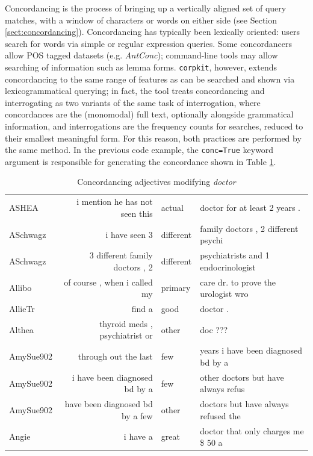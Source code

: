 Concordancing is the process of bringing up a vertically aligned set of query matches, with a window of characters or words on either side (see Section \ref{sect:concordancing}). Concordancing has typically been lexically oriented: users search for words via simple or regular expression queries. Some concordancers allow \gls{POS} tagged datasets (e.g. \emph{AntConc}); command\hyp{}line tools may allow searching of information such as lemma forms. \texttt{corpkit}, however, extends concordancing to the same range of features as can be searched and shown via lexicogrammatical querying; in fact, the tool treats concordancing and interrogating as two variants of the same task of interrogation, where concordances are the (monomodal) full text, optionally alongside grammatical information, and  interrogations are the frequency counts for searches, reduced to their smallest meaningful form. For this reason, both practices are performed by the same method. In the previous code example, the \texttt{conc=True} keyword argument is responsible for generating the concordance shown in Table \ref{conc:mod_doc_example}.

\FloatBarrier

\begin{table}[htb]
\footnotesize
\begin{tabular}{lrll}

\toprule
     ASHEA & i mention he has not seen this &  actual    &  doctor for at least 2 years .       \\
  ASchwagz &                  i have seen 3 &  different &  family doctors , 2 different psychi \\
  ASchwagz & 3 different family doctors , 2 &  different &  psychiatrists and 1 endocrinologist \\
    Allibo &   of course , when i called my &  primary   &  care dr. to prove the urologist wro \\
   AllieTr &                         find a &  good      &  doctor .                            \\
    Althea & thyroid meds , psychiatrist or &  other     &  doc ???                             \\
 AmySue902 &           through out the last &  few       &  years i have been diagnosed bd by a \\
 AmySue902 &  i have been diagnosed bd by a &  few       &  other doctors but have always refus \\
 AmySue902 & have been diagnosed bd by a few &  other    &  doctors but have always refused the \\
     Angie &                       i have a &  great     &  doctor that only charges me \$ 50 a  \\
\bottomrule
\end{tabular}
\caption{Concordancing adjectives modifying \emph{doctor}}
\label{conc:mod_doc_example}
\end{table}


